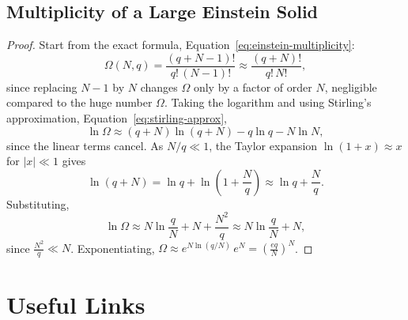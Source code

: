 \documentclass{article}
\begin{document}
\subsection{Multiplicity of a Large Einstein Solid}
\label{subsection:mult-large-einstein}
\begin{proof}
    Start from the exact formula, Equation~\eqref{eq:einstein-multiplicity}:
    \[\Omega(N,q) = \frac{(q+N-1)!}{q!\,(N-1)!} \approx \frac{(q+N)!}{q!\,N!},\]
    since replacing $N-1$ by $N$ changes $\Omega$ only by a factor of order $N$, negligible compared to the huge number $\Omega$. Taking the logarithm and using Stirling's approximation, Equation~\eqref{eq:stirling-approx},
    \[\ln\Omega \approx (q+N)\ln(q+N) - q\ln q - N\ln N,\]
    since the linear terms cancel. As $N/q \ll 1$, the Taylor expansion $\ln(1+x) \approx x$ for $|x| \ll 1$ gives
    \[\ln(q+N) = \ln q + \ln\left(1 + \frac{N}{q}\right) \approx \ln q + \frac{N}{q}.\]
    Substituting,
    \[\ln\Omega \approx N\ln\frac{q}{N} + N + \frac{N^2}{q} \approx N\ln\frac{q}{N} + N,\]
    since $\frac{N^2}{q} \ll N$. Exponentiating, $\Omega \approx e^{N\ln(q/N)}\,e^N = \left(\frac{eq}{N}\right)^N$.
\end{proof}

\section{Useful Links}
\end{document}
